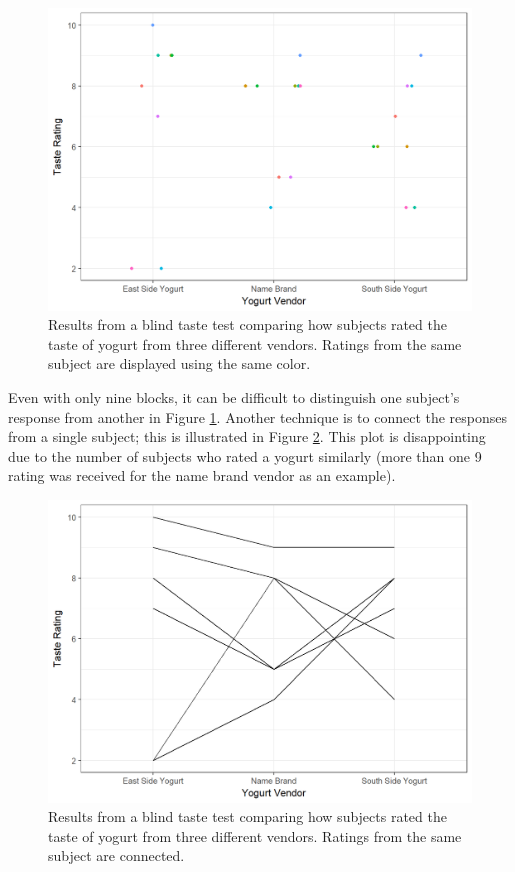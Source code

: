 \documentclass[]{book}
\theoremstyle{plain}
\theoremstyle{mydefn}
\theoremstyle{myexmpl}
\theoremstyle{remark}
\begin{document}
\begin{figure}

{\centering \includegraphics[width=0.8\linewidth]{./Images/blocksummaries-color-plot-1} 

}

\caption{Results from a blind taste test comparing how subjects rated the taste of yogurt from three different vendors.  Ratings from the same subject are displayed using the same color.}\label{fig:blocksummaries-color-plot}
\end{figure}

Even with only nine blocks, it can be difficult to distinguish one
subject's response from another in Figure
\ref{fig:blocksummaries-color-plot}. Another technique is to connect the
responses from a single subject; this is illustrated in Figure
\ref{fig:blocksummaries-line-plot}. This plot is disappointing due to
the number of subjects who rated a yogurt similarly (more than one 9
rating was received for the name brand vendor as an example).

\begin{figure}

{\centering \includegraphics[width=0.8\linewidth]{./Images/blocksummaries-line-plot-1} 

}

\caption{Results from a blind taste test comparing how subjects rated the taste of yogurt from three different vendors.  Ratings from the same subject are connected.}\label{fig:blocksummaries-line-plot}
\end{figure}
\end{document}
